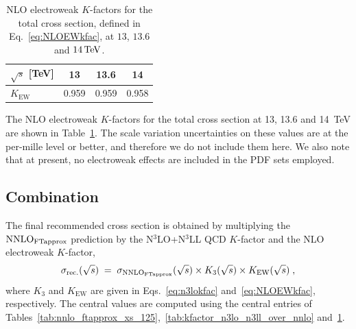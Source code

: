 \begin{table}[htbp]
\begin{center}
\begin{tabular}{lccc}
\toprule
$\sqrt{s}$ [TeV] & \textbf{13} & \textbf{13.6} & \textbf{14} \\
\midrule
$K_\mathrm{EW}$ & 0.959 & 0.959 & 0.958 \\
\bottomrule
\end{tabular}
\caption{NLO electroweak $K$-factors for the total cross section, defined in Eq.~\eqref{eq:NLOEWkfac}, at $13$, $13.6$ and $14\,\textup{TeV}$.}
\label{tab:nlo_ew_kfac}
\end{center}
\end{table}

The NLO electroweak $K$-factors for the total cross section at 13, 13.6 and 14~TeV are shown in Table~\ref{tab:nlo_ew_kfac}. The scale variation uncertainties on these values are at the per-mille level or better, and therefore we do not include them here. We also note that at present, no electroweak effects are included in the PDF sets employed. 

\subsection{Combination}\label{subsec:combination}

The final recommended cross section is obtained by multiplying the $\textup{NNLO}_{\textup{FTapprox}}$ prediction by the N$^3$LO+N$^3$LL QCD $K$-factor and the NLO electroweak $K$-factor,
\begin{equation}\label{eq:xs_reco}
\sigma_\mathrm{rec.}(\sqrt{s}) \;=\; \sigma_{\textup{NNLO}_{\textup{FTapprox}}}(\sqrt{s}) \times K_3(\sqrt{s}) \times K_\mathrm{EW}(\sqrt{s}) \;,
\end{equation}
where $K_3$ and $K_\mathrm{EW}$ are given in Eqs.~\eqref{eq:n3lokfac} and~\eqref{eq:NLOEWkfac}, respectively. The central values are computed using the
central entries of Tables~\ref{tab:nnlo_ftapprox_xs_125},~\ref{tab:kfactor_n3lo_n3ll_over_nnlo} and~\ref{tab:nlo_ew_kfac}.

